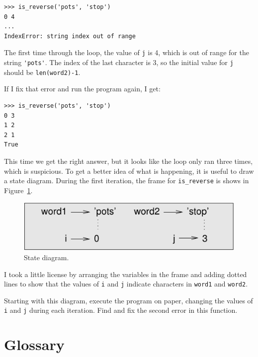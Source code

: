 \documentclass[10pt]{book}
\begin{document}
\begin{CJK}{UTF8}{gbsn}
\begin{verbatim}
>>> is_reverse('pots', 'stop')
0 4
...
IndexError: string index out of range
\end{verbatim}
%
The first time through the loop, the value of {\tt j} is 4,
which is out of range for the string \verb"'pots'".
The index of the last character is 3, so the
initial value for {\tt j} should be {\tt len(word2)-1}.

If I fix that error and run the program again, I get:

\begin{verbatim}
>>> is_reverse('pots', 'stop')
0 3
1 2
2 1
True
\end{verbatim}
%
This time we get the right answer, but it looks like the loop only ran
three times, which is suspicious.  To get a better idea of what is
happening, it is useful to draw a state diagram.  During the first
iteration, the frame for \verb"is_reverse" is shows in Figure~\ref{fig.state4}.

\begin{figure}
\centerline
{\includegraphics[scale=0.8]{figs/state4.pdf}}
\caption{State diagram.}
\label{fig.state4}
\end{figure}


I took a little license by arranging the variables in the frame
and adding dotted lines to show that the values of {\tt i} and
{\tt j} indicate characters in {\tt word1} and {\tt word2}.

\begin{exercise}
\label{isreverse}

Starting with this diagram, execute the program on paper, changing the
values of {\tt i} and {\tt j} during each iteration.  Find and fix the
second error in this function.

\end{exercise}



\section{Glossary}


\end{CJK}
\end{document}
